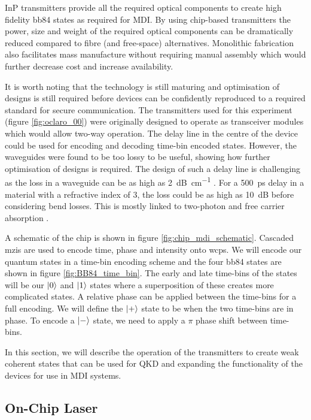 \Ac{InP} transmitters provide all the required optical components to create high fidelity \ac{bb84} states as required for \ac{MDI}. By using chip-based transmitters the power, size and weight of the required optical components can be dramatically reduced compared to fibre (and free-space) alternatives. Monolithic fabrication also facilitates mass manufacture without requiring manual assembly which would further decrease cost and increase availability.

It is worth noting that the technology is still maturing and optimisation of designs is still required before devices can be confidently reproduced to a required standard for secure communication. The transmitters used for this experiment (figure \ref{fig:oclaro_00}) were originally designed to operate as transceiver modules which would allow two-way operation. The delay line in the centre of the device could be used for encoding and decoding time-bin encoded states. However, the waveguides were found to be too lossy to be useful, showing how further optimisation of designs is required. The design of such a delay line is challenging as the loss in a waveguide can be as high as \SI{2}{dB\per\cm} \cite{JeppixRoadmap}. For a \SI{500}{ps} delay in a material with a refractive index of 3, the loss could be as high as \SI{10}{dB} before considering bend losses. This is mostly linked to two-photon and free carrier absorption \cite{Kumar2019}.

A schematic of the chip is shown in figure \ref{fig:chip_mdi_schematic}. Cascaded \acp{mzi} are used to encode time, phase and intensity onto \acp{wcp}.  We will encode our quantum states in a time-bin encoding scheme and the four \ac{bb84} states are shown in figure \ref{fig:BB84_time_bin}. The early and late time-bins of the states will be our $\ket{0}$ and $\ket{1}$ states where a superposition of these creates more complicated states. A relative phase can be applied between the time-bins for a full encoding. We will define the $\ket{+}$ state to be when the two time-bins are in phase. To encode a $\ket{-}$ state, we need to apply a $\pi$ phase shift between time-bins. 

In this section, we will describe the operation of the transmitters to create weak coherent states that can be used for \acl{QKD} and expanding the functionality of the devices for use in \ac{MDI} systems.

\subsection{On-Chip Laser}


